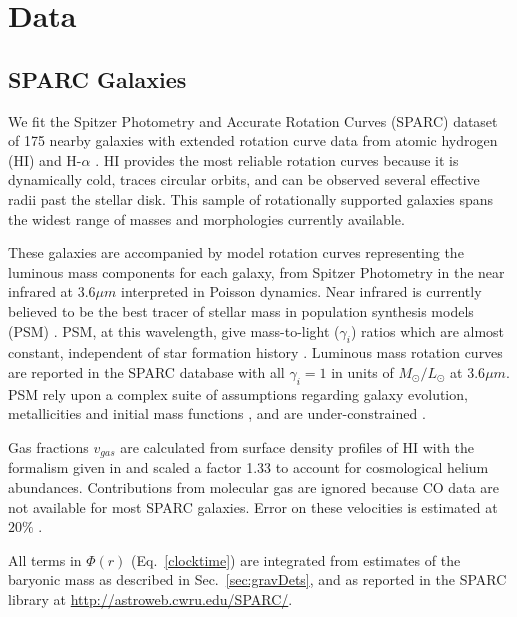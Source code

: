 \documentclass[reprint,%
 amsmath,amssymb,
 aps,
]{revtex4-1}
\begin{document}
      
    

\section{Data \label{sec:data}}
 
 \subsection{SPARC Galaxies}
 We fit the Spitzer Photometry and Accurate Rotation Curves (SPARC) dataset  of  175 nearby galaxies with extended rotation curve data from atomic hydrogen (HI)  and H-$\alpha$ \cite{2016Lelli}. 
 HI provides the most reliable
 rotation curves because it is dynamically cold, traces circular orbits, and can be observed several effective radii past the stellar disk. 
 This sample of rotationally supported galaxies   spans the widest range of masses and morphologies currently available. 
 
These galaxies are  accompanied by model rotation curves representing   the  luminous mass components for each galaxy,  from   Spitzer Photometry in the 
   near infrared  at 3.6$\mu m$ interpreted in Poisson dynamics. 
   Near infrared  is  currently believed to be the best tracer of stellar mass   in population synthesis models (PSM) \cite{10.1093/mnras/sty3223}.  PSM, at this wavelength,   give mass-to-light ($\gamma_i$) ratios which are almost constant, independent of star formation history \cite{BelldYong,10.1093/mnras/sty3223}. Luminous mass rotation curves are reported in the SPARC database with all $\gamma_i=1$ in units of $M_{\odot} / L_{\odot}$   at 3.6$\mu m$. 
   PSM rely upon a complex  suite of  assumptions regarding galaxy evolution, metallicities and initial mass functions  \cite{BelldYong,10.1093/mnras/sty3223}, and are under-constrained  \cite{Conroy,Dutton_2005}.   
   
     Gas fractions $v_{gas}$ are calculated from surface density profiles of HI  with the formalism given in  \cite{1983MNRAS.203..735C} and scaled 
     a factor 1.33 to account for cosmological helium abundances.  Contributions from molecular gas are ignored   because CO data are not available for most SPARC galaxies. 
     Error on these velocities is estimated at $20\%$ \cite{2016Lelli}. 

   
   
     All terms in $\Phi(r)$ (Eq.~\ref{clocktime})  are    integrated from estimates of the baryonic mass as described in Sec.~\ref{sec:gravDets}, and as reported  in the      SPARC  library at \url{http://astroweb.cwru.edu/SPARC/}.    
\end{document}
